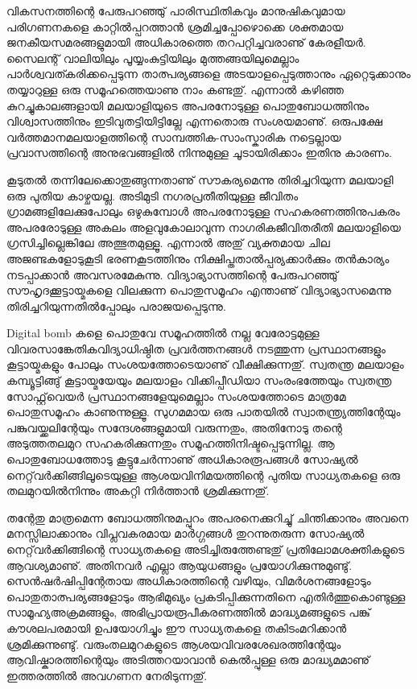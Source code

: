 വികസനത്തിന്റെ പേരുപറഞ്ഞു് പാരിസ്ഥിതികവും മാനുഷികവുമായ പരിഗണനകളെ കാറ്റില്‍പ്പറത്താന്‍ ശ്രമിച്ചപ്പോഴൊക്കെ 
ശക്തമായ ജനകീയസമരങ്ങളുമായി അധികാരത്തെ തറപറ്റിച്ചവരാണു് കേരളീയര്‍. സൈലന്റ് വാലിയിലും പൂയ്യംകുട്ടിയിലും
 മുത്തങ്ങയിലുമെല്ലാം പാര്‍ശ്വവത്കരിക്കപ്പെടുന്ന താത്പര്യങ്ങളെ അടയാളപ്പെടുത്താനും ഏറ്റെടുക്കാനും തയ്യാറുള്ള ഒരു 
സമൂഹത്തെയാണു നാം കണ്ടതു്. എന്നാല്‍ കഴിഞ്ഞ കുറച്ചുകാലങ്ങളായി മലയാളിയുടെ അപരനോടുള്ള പൊതുബോധത്തിനും 
വിശ്വാസത്തിനും ഇടിവുതട്ടിയിട്ടില്ലേ എന്നതൊരു സംശയമാണു്. ഒരുപക്ഷേ വര്‍ത്തമാനമലയാളത്തിന്റെ സാമ്പത്തിക-സാംസ്കാരിക 
നട്ടെല്ലായ പ്രവാസത്തിന്റെ അനുഭവങ്ങളില്‍ നിന്നുമുള്ള ചൂടായിരിക്കാം ഇതിനു കാരണം.

കൂടുതല്‍ തന്നിലേക്കൊതുങ്ങുന്നതാണു് സൗകര്യമെന്നു തിരിച്ചറിയുന്ന മലയാളി ഒരു പുതിയ കാഴ്ചയല്ല. അടിമുടി നഗരപ്രതീതിയുള്ള
 ജീവിതം ഗ്രാമങ്ങളിലേക്കുപോലും ഒഴുകുമ്പോള്‍ അപരനോടുള്ള സഹകരണത്തിനുപകരം അപരരോടുള്ള അകലം അളവുകോലാവുന്ന 
നാഗരികജീവിതരീതി മലയാളിയെ ഗ്രസിച്ചില്ലെങ്കിലേ അത്ഭുതമുള്ളൂ. എന്നാല്‍ അതു് വ്യക്തമായ ചില അജണ്ടകളോടുകൂടി ഭരണകൂടത്തിനും
 നിക്ഷിപ്തതാല്‍പ്പര്യക്കാര്‍ക്കും തന്‍കാര്യം നടപ്പാക്കാന്‍ അവസരമേകുന്നു. വിദ്യാഭ്യാസത്തിന്റെ പേരുപറഞ്ഞു് സൗഹൃദക്കൂട്ടായ്മകളെ 
വിലക്കുന്ന പൊതുസമൂഹം എന്താണു് വിദ്യാഭ്യാസമെന്നു തിരിച്ചറിയുന്നതില്‍പ്പോലും പരാജയപ്പെടുന്നു.

Digital bomb കളെ പൊതുവേ സമൂഹത്തില്‍ നല്ല വേരോട്ടമുള്ള വിവരസാങ്കേതികവിദ്യാധിഷ്ഠിത പ്രവര്‍ത്തനങ്ങള്‍ നടത്തുന്ന 
പ്രസ്ഥാനങ്ങളും കൂട്ടായ്മകളും പോലും സംശയത്തോടെയാണു് വീക്ഷിക്കുന്നതു്. സ്വതന്ത്ര മലയാളം കമ്പ്യൂട്ടിങ്ങു് കൂട്ടായ്മയേയും മലയാളം 
വിക്കിപ്പീഡിയാ സംരംഭത്തേയും സ്വതന്ത്ര സോഫ്റ്റ്‌വെയര്‍ പ്രസ്ഥാനങ്ങളേയുമെല്ലാം സംശയത്തോടെ മാത്രമേ പൊതുസമൂഹം കാണുന്നുള്ളൂ.
സുഗമമായ ഒരു പാതയില്‍ സ്വാതന്ത്ര്യത്തിന്റേയും പങ്കുവയ്ക്കലിന്റേയും സന്ദേശങ്ങളുമായി വരുന്നതും, അതിനോടു തന്റെ
 അടുത്തതലമുറ സഹകരിക്കുന്നതും സമൂഹത്തിനിഷ്ടപ്പെടുന്നില്ല. ആ പൊതുബോധത്തോടു കൂട്ടുചേര്‍ന്നാണു് അധികാരരൂപങ്ങള്‍ 
സോഷ്യല്‍ നെറ്റ്‌വര്‍ക്കിങ്ങിലൂടെയുള്ള ആശയവിനിമയത്തിന്റെ പുതിയ സാധ്യതകളെ ഒരു തലമുറയില്‍നിന്നും അകറ്റി നിര്‍ത്താന്‍ 
ശ്രമിക്കുന്നതു്.

തന്റേതു മാത്രമെന്ന ബോധത്തിനുമപ്പുറം അപരനെക്കുറിച്ചു് ചിന്തിക്കാനും അവനെ മനസ്സിലാക്കാനും വിപ്ലവകരമായ 
മാര്‍ഗ്ഗങ്ങള്‍ തുറന്നുതരുന്ന സോഷ്യല്‍ നെറ്റ്‌വര്‍ക്കിങ്ങിന്റെ സാധ്യതകളെ അടിച്ചിരുത്തേണ്ടതു് പ്രതിലോമശക്തികളുടെ
 ആവശ്യമാണു്. അതിനവര്‍ എല്ലാ ആയുധങ്ങളും പ്രയോഗിക്കുന്നുമുണ്ടു്. സെന്‍ഷര്‍ഷിപ്പിന്റേതായ അധികാരത്തിന്റെ വഴിയും, 
വിമര്‍ശനങ്ങളോടും പൊതുതാത്പര്യങ്ങളോടും ആഭിമുഖ്യം പ്രകടിപ്പിക്കുന്നതിനെ എതിര്‍ത്തുകൊണ്ടുള്ള സാമൂഹ്യഅക്രമങ്ങളും, 
അഭിപ്രായരൂപീകരണത്തില്‍ മാദ്ധ്യമങ്ങളുടെ പങ്കു് കൗശലപരമായി ഉപയോഗിച്ചും ഈ സാധ്യതകളെ തകിടംമറിക്കാന്‍ 
ശ്രമിക്കുന്നുണ്ടു്. വരുംതലമുറകളുടെ ആശയവിവരശേഖരത്തിന്റേയും ആവിഷ്കാരത്തിന്റെയും അടിത്തറയാവാന്‍ കെല്‍പ്പുള്ള ഒരു 
മാദ്ധ്യമമാണു് ഇത്തരത്തില്‍ അവഗണന നേരിടുന്നതു്.

